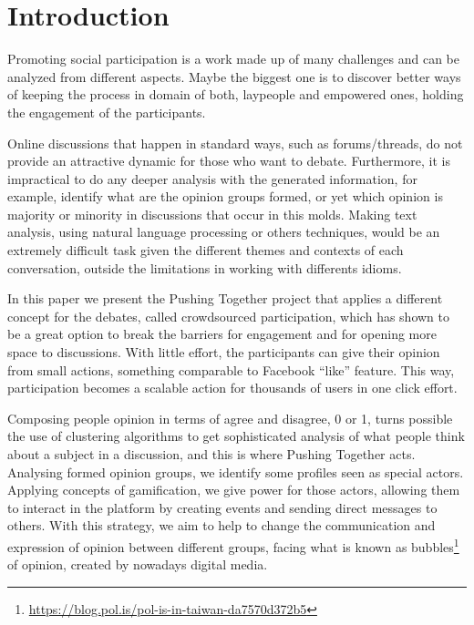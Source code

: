 \documentclass{llncs}
\begin{document}
\section{Introduction}
\label{sec:intro}
  Promoting social participation is a work made up of many challenges and can be
  analyzed from different aspects. Maybe the biggest one is to discover better
  ways of keeping the process in domain of both, laypeople and empowered ones,
  holding the engagement of the participants.

  Online discussions that happen in standard ways, such as forums/threads, do not
  provide an attractive dynamic for those who want to debate. Furthermore, it is
  impractical to do any deeper analysis with the generated information, for example,
  identify what are the opinion groups formed, or yet which opinion is majority
  or minority in discussions that occur in this molds. Making text analysis, using natural
  language processing or others techniques, would be an extremely difficult task
  given the different themes and contexts of each conversation, outside the
  limitations in working with differents idioms.

  In this paper we present the Pushing Together project that applies a different concept for the debates,
  called crowdsourced participation, which has shown to be a great option to break the
  barriers for engagement and for opening more space to discussions. With little
  effort, the participants can give their opinion from small actions,
  something comparable to Facebook ``like'' feature. This way, participation becomes
  a scalable action for thousands of users in one click effort.

  Composing people opinion in terms of agree and disagree, 0 or 1, turns possible
  the use of clustering algorithms to get sophisticated analysis of what people
  think about a subject in a discussion, and this is where Pushing Together acts.
  Analysing formed opinion groups, we identify some profiles seen as special actors.
  Applying concepts of gamification, we give power for those actors, allowing
  them to interact in the platform by creating events and sending direct messages
  to others. With this strategy, we aim to help to change the communication and expression
  of opinion between different groups, facing what is known as
  bubbles\footnote{\url{https://blog.pol.is/pol-is-in-taiwan-da7570d372b5}} of
  opinion, created by nowadays digital media.

\end{document}
